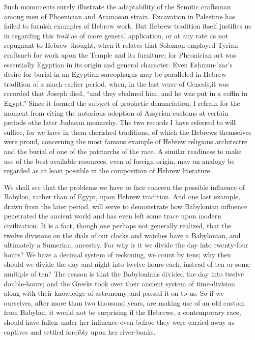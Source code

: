 \documentclass[12pt,oneside]{book}
\begin{document}
Such monuments surely illustrate the adaptability of the Semitic craftsman among men of Phoenician and Aramaean strain. Excavation in Palestine has failed to furnish examples of Hebrew work. But Hebrew tradition itself justifies us in regarding this \textit{trait} as of more general application, or at any rate as not repugnant to Hebrew thought, when it relates that Solomon employed Tyrian craftsneb for work upon the Temple and its furniture; for Pheonician art was essentially Egyptian in its origin and general character. Even Eshmun-'zar's desire for burial in an Egyptian sarcophagus may be paralleled in Hebrew tradition of a much earlier period, when, in the last verse of Genesis,\footnotemark it was recorded that Joseph died, ``and they ebalmed him, and he was put in a coffin in Egypt.'' Since it formed the subject of prophetic denunciation, I refrain for the moment from citing the notorious adoption of Assyrian customs at certain periods othe later Judaean monarchy. The two records I have referred to will suffice, for we have in them cherished traditions, of which the Hebrews themselves were proud, concerning the most famous example of Hebrew religious architectre and the burial of one of the patriarchs of the race. A similar readiness to make use of the best available resources, even of foreign origin, may on analogy be regarded as at least possible in the composition of Hebrew literature. \par 


We shall see that the problems we have to face concern the possible influence of Babylon, rather than of Egypt, upon Hebrew tradition. And one last example, drawn from the later period, will serve to demonstrate how Babylonian influence penetrated the ancient world and has even left some trace upon modern civilization. It is a fact, though one perhaps not generally realized, that the twelve divisions on the dials of our clocks and watches have a Babylonian, and ultimately a Sumerian, ancestry. For why is it we divide the day into twenty-four hours? We have a decimal system of reckoning, we count by tens; why then should we divide the day and night into twelve hours each, instead of ten or some multiple of ten? The reason is that the Babylonians divided the day into twelve double-hours; and the Greeks took over their ancient system of time-division along with their knowledge of astronomy and passed it on to us. So if we ourselves, after more than two thousand years, are making use of an old custom from Babylon, it would not be surprising if the Hebrews, a contemporary race, should have fallen under her influence even befroe they were carried away as captives and settled forcibly upon her river-banks. \par 
\end{document}
